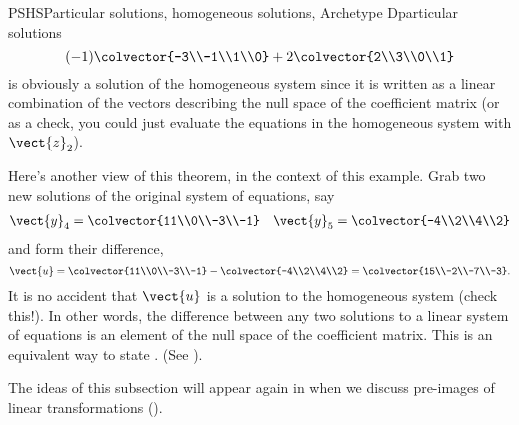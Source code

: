 \begin{example}{PSHS}{Particular solutions, homogeneous solutions, Archetype D}{particular solutions}
\begin{equation*}
(-1)\colvector{-3\\-1\\1\\0}+2\colvector{2\\3\\0\\1}
\end{equation*}
%
is obviously a solution of the homogeneous system since it is written as a linear combination of the vectors describing the null space of the coefficient matrix (or as a check, you could just evaluate the equations in the homogeneous system with $\vect{z}_2$).\par
%
Here's another view of this theorem, in the context of this example.  Grab two new solutions of the original system of equations, say
%
\begin{align*}
\vect{y}_4=\colvector{11\\0\\-3\\-1}&&
\vect{y}_5=\colvector{-4\\2\\4\\2}
\end{align*}
%
and form their difference,
%
\begin{equation*}
\vect{u}=\colvector{11\\0\\-3\\-1}-\colvector{-4\\2\\4\\2}=\colvector{15\\-2\\-7\\-3}.
\end{equation*}
%
It is no accident that $\vect{u}$ is a solution to the homogeneous system (check this!).  In other words, the difference between any two solutions to a linear system of equations is an element of the null space of the coefficient matrix.  This is an equivalent way to state .   (See ).
\end{example}
%
The ideas of this subsection will appear again in  when we discuss pre-images of linear transformations ().
%

